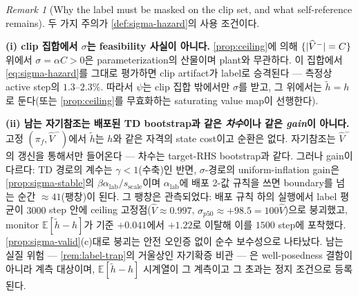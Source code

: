 \documentclass[11pt]{article}
\theoremstyle{plain}
\theoremstyle{definition}
\theoremstyle{remark}
\newtheorem{remark}[theorem]{Remark}
\newcommand{\E}{\mathbb{E}}
\DeclarePairedDelimiter{\abs}{\lvert}{\rvert}
\newcommand{\Vhat}{\widehat V}
\begin{document}
\begin{remark}[Why the label must be masked on the clip set, and what self-reference remains]\label{rem:sigma-caveats}
두 가지 주의가 \cref{def:sigma-hazard}의 사용 조건이다.

\textbf{(i) clip 집합에서 $\sigma$는 feasibility 사실이 아니다.} \cref{prop:ceiling}에 의해
$\{\abs{\Vhat^-}=C\}$ 위에서 $\sigma=\alpha C>0$은 parameterization의 산물이며 plant와 무관하다.
이 집합에서 \eqref{eq:sigma-hazard}를 그대로 평가하면 clip artifact가 label로 승격된다 ---
측정상 active step의 $1.3$--$2.3\%$. 따라서 $\psi$는 clip 집합 밖에서만 $\sigma$를 받고, 그
위에서는 $\tilde h=h$로 둔다(또는 \cref{prop:ceiling}를 무효화하는 saturating value map이 선행한다).

\textbf{(ii) 남는 자기참조는 배포된 TD bootstrap과 같은 \emph{차수}이나 같은 \emph{gain}이
아니다.} 고정 $(\pi_f,\Vhat^-)$에서 $\tilde h$는 $h$와 같은 자격의 state cost이고 순환은
없다. 자기참조는 $\Vhat^-$의 갱신을 통해서만 들어온다 --- 차수는 target-RHS bootstrap과
같다. 그러나 gain이 다르다: TD 경로의 계수는 $\gamma<1$(수축)인 반면, $\sigma$-경로의
uniform-inflation gain은 \cref{prop:sigma-stable}의 $\beta\alpha_{\mathrm{lab}}/s_{\mathrm{scale}}$이며
$\alpha_{\mathrm{lab}}$에 배포 2-값 규칙을 쓰면 boundary를 넘는 순간 $\approx41$(팽창)이
된다. 그 팽창은 관측되었다: 배포 규칙 하의 실행에서 label 평균이 $3000$ step 안에 ceiling
고정점($\Vhat\approx0.997$, $\sigma_{p50}\approx+98.5=100\Vhat$)으로 붕괴했고, monitor
$\E[\tilde h-h]$가 기준 $+0.041$에서 $+1.22$로 이탈해 이를 $1500$ step에 포착했다.
\cref{prop:sigma-valid}(c)대로 붕괴는 안전 오인증 없이 순수 보수성으로 나타났다. 남는 실질
위험 --- \cref{rem:label-trap}의 거울상인 자기확증 비관 --- 은 well-posedness 결함이 아니라
계측 대상이며, $\E[\tilde h-h]$ 시계열이 그 계측이고 그 초과는 정지 조건으로 등록된다.
\end{remark}
\end{document}
